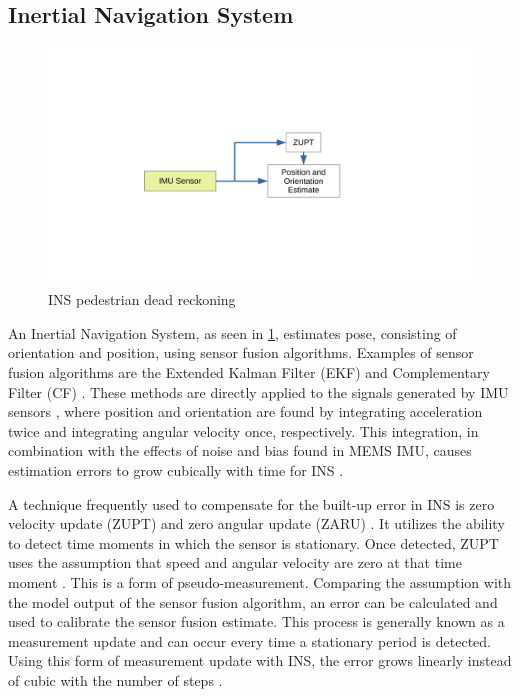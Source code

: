 \subsection{Inertial Navigation System}
\label{sec:rw-INS}
\begin{figure}[]
	\centering
	\includegraphics[trim=80 140 150 80, clip, width=0.8\linewidth]{images/INS_diagram}
	\caption{\ac{INS} pedestrian dead reckoning}
	\label{fig:ins_diagram}
\end{figure}
An Inertial Navigation System, as seen in \cref{fig:ins_diagram}, estimates pose, consisting of orientation and position, using sensor fusion algorithms. Examples of sensor fusion algorithms are the Extended Kalman Filter (EKF) and Complementary Filter (CF) \cite{Kok2017}. These methods are directly applied to the signals generated by  \ac{IMU} sensors \cite{Wu2019}, where position and orientation are found by integrating acceleration twice and integrating angular velocity once, respectively. This integration, in combination with the effects of noise and bias found in MEMS IMU, causes estimation errors to grow cubically with time for INS \cite{Harle2013}.  \par

A technique frequently used to compensate for the built-up error in INS is zero velocity update (ZUPT) and zero angular update (ZARU) \cite{Harle2013}. It utilizes the ability to detect time moments in which the sensor is stationary. Once detected, ZUPT uses the assumption that speed and angular velocity are zero at that time moment \cite{Wu2019,Harle2013}. This is a form of pseudo-measurement. Comparing the assumption with the model output of the sensor fusion algorithm, an error can be calculated and used to calibrate the sensor fusion estimate. This process is generally known as a measurement update and can occur every time a stationary period is detected.  Using this form of measurement update with INS, the error grows linearly instead of cubic with the number of steps \cite{foxlin2005pedestrian}.\par

